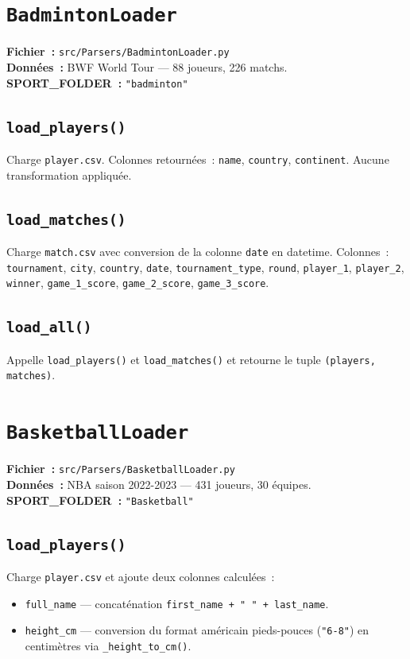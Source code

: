 \documentclass[12pt,a4paper]{article}
\begin{document}
\section{\texttt{BadmintonLoader}}

\textbf{Fichier~:} \texttt{src/Parsers/BadmintonLoader.py}\\
\textbf{Données~:} BWF World Tour — 88 joueurs, 226 matchs.\\
\textbf{SPORT\_FOLDER~:} \texttt{"badminton"}

\subsection{\texttt{load\_players()}}
Charge \texttt{player.csv}. Colonnes retournées~: \texttt{name}, \texttt{country},
\texttt{continent}. Aucune transformation appliquée.

\subsection{\texttt{load\_matches()}}
Charge \texttt{match.csv} avec conversion de la colonne \texttt{date} en datetime.
Colonnes~: \texttt{tournament}, \texttt{city}, \texttt{country}, \texttt{date},
\texttt{tournament\_type}, \texttt{round}, \texttt{player\_1}, \texttt{player\_2},
\texttt{winner}, \texttt{game\_1\_score}, \texttt{game\_2\_score},
\texttt{game\_3\_score}.

\subsection{\texttt{load\_all()}}
Appelle \texttt{load\_players()} et \texttt{load\_matches()} et retourne le
tuple \texttt{(players, matches)}.

\section{\texttt{BasketballLoader}}

\textbf{Fichier~:} \texttt{src/Parsers/BasketballLoader.py}\\
\textbf{Données~:} NBA saison 2022-2023 — 431 joueurs, 30 équipes.\\
\textbf{SPORT\_FOLDER~:} \texttt{"Basketball"}

\subsection{\texttt{load\_players()}}
Charge \texttt{player.csv} et ajoute deux colonnes calculées~:
\begin{itemize}
    \item \texttt{full\_name} — concaténation \texttt{first\_name + " " + last\_name}.
    \item \texttt{height\_cm} — conversion du format américain pieds-pouces
    (\texttt{"6-8"}) en centimètres via \texttt{\_height\_to\_cm()}.
\end{itemize}
\end{document}

